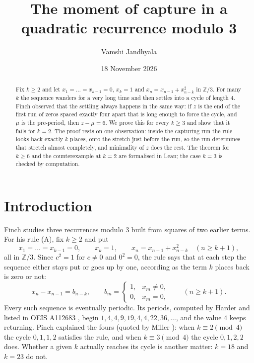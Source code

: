 \documentclass[11pt]{amsart}
\title[The moment of capture]{The moment of capture in a quadratic recurrence modulo 3}
\author{Vamshi Jandhyala}
\date{18 November 2026}
\theoremstyle{definition}
\begin{document}
\begin{abstract}
Fix $k\ge 2$ and let $x_1=\dots=x_{k-1}=0$, $x_k=1$ and $x_n=x_{n-1}+x_{n-k}^2$ in $\mathbb{Z}/3$. For many $k$
the sequence wanders for a very long time and then settles into a cycle of length $4$. Finch observed that the
settling always happens in the same way: if $z$ is the end of the first run of zeros spaced exactly four apart
that is long enough to force the cycle, and $\mu$ is the pre-period, then $z-\mu=6$. We prove this for every
$k\ge 3$ and show that it fails for $k=2$. The proof rests on one observation: inside the capturing run the rule
looks back exactly $k$ places, onto the stretch just before the run, so the run determines that stretch almost
completely, and minimality of $z$ does the rest. The theorem for $k\ge6$ and the counterexample at $k=2$ are
formalised in Lean; the case $k=3$ is checked by computation.
\end{abstract}

\maketitle

\section{Introduction}

Finch \cite{F26} studies three recurrences modulo $3$ built from squares of two earlier terms. For his rule (A),
fix $k\ge2$ and put
\[
x_1=\dots=x_{k-1}=0,\qquad x_k=1,\qquad x_n=x_{n-1}+x_{n-k}^2\quad(n\ge k+1),
\]
all in $\mathbb{Z}/3$. Since $c^2=1$ for $c\neq0$ and $0^2=0$, the rule says that at each step the sequence
either stays put or goes up by one, according as the term $k$ places back is zero or not:
\begin{equation}\label{eq:step}
x_n-x_{n-1}=b_{n-k},\qquad b_m=\begin{cases}1,& x_m\neq0,\\ 0,& x_m=0,\end{cases}\qquad(n\ge k+1).
\end{equation}
Every such sequence is eventually periodic. Its periods, computed by Harder \cite{F02} and listed in OEIS A112683
\cite{Sl}, begin $1,4,4,9,19,4,4,22,36,\dots$, and the value $4$ keeps returning. Pinch explained the fours
(quoted by Miller \cite{Mi}): when $k\equiv2\pmod4$ the cycle $0,1,1,2$ satisfies the rule, and when $k\equiv3\pmod4$ the cycle
$0,1,2,2$ does. Whether a given $k$ actually reaches its cycle is another matter: $k=18$ and $k=23$ do not.
\end{document}
